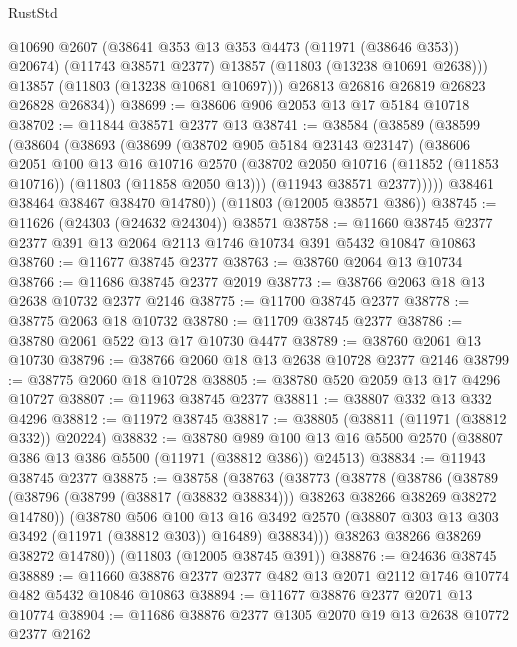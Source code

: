 \begin{lexlean}{RustStd}
\begin{coremodule}
            @10690
            @2607
            (@38641 @353 @13 @353 @4473 (@11971 (@38646 @353)) @20674)
            (@11743 @38571 @2377)
            @13857
            (@11803 (@13238 @10691 @2638)))
          @13857
          (@11803 (@13238 @10681 @10697)))
        @26813
        @26816
        @26819
        @26823
        @26828
        @26834))
@38699 := @38606 @906 @2053 @13 @17 @5184 @10718
@38702 := @11844 @38571 @2377 @13
@38741 := @38584
    (@38589
      (@38599
        (@38604
          (@38693
            (@38699
              (@38702 @905 @5184 @23143 @23147)
              (@38606
                @2051
                @100
                @13
                @16
                @10716
                @2570
                (@38702 @2050 @10716 (@11852 (@11853 @10716)) (@11803 (@11858 @2050 @13)))
                (@11943 @38571 @2377)))))
        @38461
        @38464
        @38467
        @38470
        @14780))
    (@11803 (@12005 @38571 @386))
@38745 := @11626 (@24303 (@24632 @24304)) @38571
@38758 := @11660 @38745 @2377 @2377 @391 @13 @2064 @2113 @1746 @10734 @391 @5432 @10847 @10863
@38760 := @11677 @38745 @2377
@38763 := @38760 @2064 @13 @10734
@38766 := @11686 @38745 @2377 @2019
@38773 := @38766 @2063 @18 @13 @2638 @10732 @2377 @2146
@38775 := @11700 @38745 @2377
@38778 := @38775 @2063 @18 @10732
@38780 := @11709 @38745 @2377
@38786 := @38780 @2061 @522 @13 @17 @10730 @4477
@38789 := @38760 @2061 @13 @10730
@38796 := @38766 @2060 @18 @13 @2638 @10728 @2377 @2146
@38799 := @38775 @2060 @18 @10728
@38805 := @38780 @520 @2059 @13 @17 @4296 @10727
@38807 := @11963 @38745 @2377
@38811 := @38807 @332 @13 @332 @4296
@38812 := @11972 @38745
@38817 := @38805 (@38811 (@11971 (@38812 @332)) @20224)
@38832 := @38780
    @989
    @100
    @13
    @16
    @5500
    @2570
    (@38807 @386 @13 @386 @5500 (@11971 (@38812 @386)) @24513)
@38834 := @11943 @38745 @2377
@38875 := @38758
    (@38763
      (@38773
        (@38778
          (@38786
            (@38789 (@38796 (@38799 (@38817 (@38832 @38834))) @38263 @38266 @38269 @38272 @14780))
            (@38780
              @506
              @100
              @13
              @16
              @3492
              @2570
              (@38807 @303 @13 @303 @3492 (@11971 (@38812 @303)) @16489)
              @38834)))
        @38263
        @38266
        @38269
        @38272
        @14780))
    (@11803 (@12005 @38745 @391))
@38876 := @24636 @38745
@38889 := @11660 @38876 @2377 @2377 @482 @13 @2071 @2112 @1746 @10774 @482 @5432 @10846 @10863
@38894 := @11677 @38876 @2377 @2071 @13 @10774
@38904 := @11686 @38876 @2377 @1305 @2070 @19 @13 @2638 @10772 @2377 @2162

\end{coremodule}
\end{lexlean}
